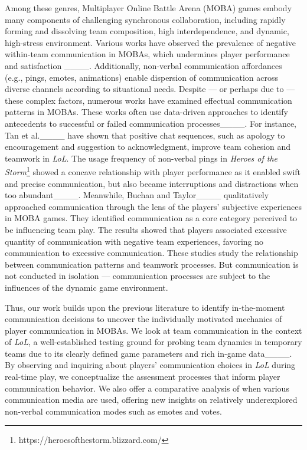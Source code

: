 Among these genres, Multiplayer Online Battle Arena (MOBA) games embody many components of challenging synchronous collaboration, including rapidly forming and dissolving team composition, high interdependence, and dynamic, high-stress environment. Various works have observed the prevalence of negative within-team communication in MOBAs, which undermines player performance and satisfaction ____. Additionally, non-verbal communication affordances (e.g., pings, emotes, animations) enable dispersion of communication across diverse channels according to situational needs. Despite --- or perhaps due to --- these complex factors, numerous works have examined effectual communication patterns in MOBAs. These works often use data-driven approaches to identify antecedents to successful or failed communication processes____. For instance, Tan et al.____ have shown that positive chat sequences, such as apology to encouragement and suggestion to acknowledgment, improve team cohesion and teamwork in \textit{LoL}. The usage frequency of non-verbal pings in \textit{Heroes of the Storm}\footnote{https://heroesofthestorm.blizzard.com/} showed a concave relationship with player performance as it enabled swift and precise communication, but also became interruptions and distractions when too abundant____. Meanwhile, Buchan and Taylor____ qualitatively approached communication through the lens of the players' subjective experiences in MOBA games. They identified communication as a core category perceived to be influencing team play. The results showed that players associated excessive quantity of communication with negative team experiences, favoring no communication to excessive communication. These studies study the relationship between communication patterns and teamwork processes. But communication is not conducted in isolation --- communication processes are subject to the influences of the dynamic game environment.

Thus, our work builds upon the previous literature to identify in-the-moment communication decisions to uncover the individually motivated mechanics of player communication in MOBAs. We look at team communication in the context of \textit{LoL}, a well-established testing ground for probing team dynamics in temporary teams due to its clearly defined game parameters and rich in-game data____. By observing and inquiring about players' communication choices in \textit{LoL} during real-time play, we conceptualize the assessment processes that inform player communication behavior. We also offer a comparative analysis of when various communication media are used, offering new insights on relatively underexplored non-verbal communication modes such as emotes and votes.



